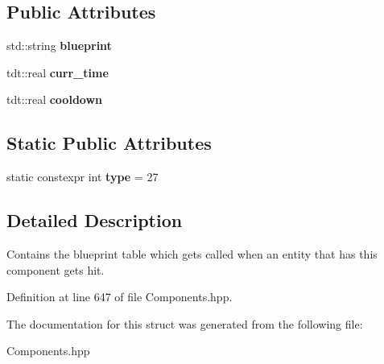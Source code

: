 \subsection*{Public Attributes}
\begin{DoxyCompactItemize}
\item 
std\+::string {\bfseries blueprint}\hypertarget{struct_on_hit_component_a45ad4149f948fd41d7588bfa5ae58f37}{}\label{struct_on_hit_component_a45ad4149f948fd41d7588bfa5ae58f37}

\item 
tdt\+::real {\bfseries curr\+\_\+time}\hypertarget{struct_on_hit_component_adf4dc96c8f54b02e6b691c969af08939}{}\label{struct_on_hit_component_adf4dc96c8f54b02e6b691c969af08939}

\item 
tdt\+::real {\bfseries cooldown}\hypertarget{struct_on_hit_component_a3c8a85a54987f36f098692a8c7850309}{}\label{struct_on_hit_component_a3c8a85a54987f36f098692a8c7850309}

\end{DoxyCompactItemize}
\subsection*{Static Public Attributes}
\begin{DoxyCompactItemize}
\item 
static constexpr int {\bfseries type} = 27\hypertarget{struct_on_hit_component_a40e9cedb165528ed4b73832765266000}{}\label{struct_on_hit_component_a40e9cedb165528ed4b73832765266000}

\end{DoxyCompactItemize}


\subsection{Detailed Description}
Contains the blueprint table which gets called when an entity that has this component gets hit. 

Definition at line 647 of file Components.\+hpp.



The documentation for this struct was generated from the following file\+:\begin{DoxyCompactItemize}
\item 
Components.\+hpp\end{DoxyCompactItemize}

